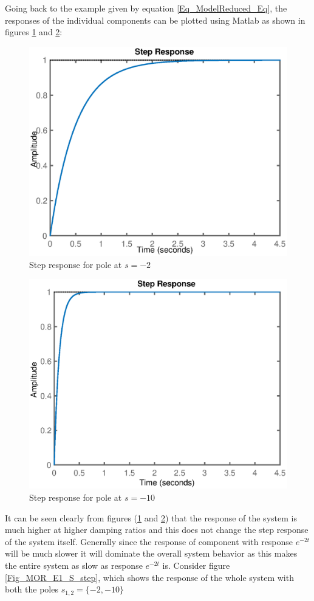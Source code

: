 \clearpage
Going back to the example given by equation \eqref{Eq_ModelReduced_Eq}, the responses of the individual components can be plotted using Matlab as shown in figures \ref{Fig_MOR_E1_C1_step} and \ref{Fig_MOR_E1_C2_step}:
\begin{figure}[h!]
	\centering
	\includegraphics[width=0.7\linewidth]{Bilder/MOR_E1_C1_step.eps}
	\caption{Step response for pole at $s = -2$}
	\label{Fig_MOR_E1_C1_step}
\end{figure}
\begin{figure}[h!]
	\centering
	\includegraphics[width=0.7\linewidth]{Bilder/MOR_E1_C2_step.eps}
	\caption{Step response for pole at $s = -10$}
	\label{Fig_MOR_E1_C2_step}
\end{figure}
\clearpage
It can be seen clearly from figures (\ref{Fig_MOR_E1_C1_step} and \ref{Fig_MOR_E1_C2_step}) that the response of the system is much higher at higher damping ratios and this does not change the step response of the system itself. Generally since the response of component with response $e^{-2t}$ will be much slower it will dominate the overall system behavior as this makes the entire system as slow as response $e^{-2t}$ is. Consider figure \ref{Fig_MOR_E1_S_step}, which shows the response of the whole system with both the poles $s_{1,2} = \{ -2,-10 \}$
